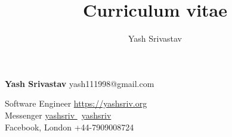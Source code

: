 \documentclass[9pt]{extarticle}
\title{Curriculum vitae}
\author{Yash Srivastav}
\begin{document}

\begingroup
{}

\begin{minipage}[t]{\textwidth}
{\Huge\textbf{\sc Yash Srivastav}}
\hfill
yash111998@gmail.com \faEnvelope


Software Engineer
\hfill
\href{https://yashsriv.org}{https://yashsriv.org \faHome}\\

Messenger
\hfill
\href{https://github.com/yashsriv}{yashsriv \faGithub} \textbar \
\href{https://www.linkedin.com/in/yashsriv/}{yashsriv \faLinkedin} \\

Facebook, London
\hfill
+44-7909008724 \faMobile \\
\end{minipage}
% 
\begin{minipage}[t]{0.49\textwidth}
  \vspace{3mm}
  
  
\end{minipage}
\hfill
\begin{minipage}[t]{0.49\textwidth}
  \vspace{3mm}
  
  
  
\end{minipage}
% 

\endgroup
\end{document}
